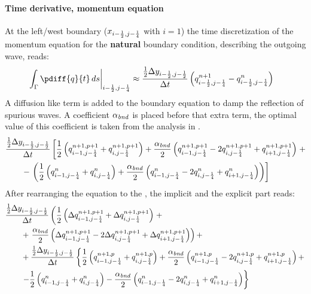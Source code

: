 \paragraph*{Time derivative, momentum equation}
At the left/west boundary ($x_{i-\frac{1}{2}, j-\frac{1}{4}}$ with $i=1$) the time discretization of the momentum equation for the \textbf{natural} boundary condition, describing the outgoing wave, reads:
\begin{align}
    \left. \int_\Gamma\pdiff{q}{t}\, ds \right|_{i-\half, j-\quart} & \approx \frac{\half\Dy_{i-\half, j-\half}}{\Dt} \left(  q^{n+1}_{i-\half, j-\quart} - q^{n}_{i-\half, j-\quart} \right)
\end{align}
A diffusion like term is added to the boundary equation to damp the reflection of spurious waves.
A coefficient $\alpha_{\it bnd}$ is placed before that extra term, the optimal value of this coefficient is taken from the analysis in \citet{transpeq-analysisdiscretizationinsidedomain_boundaries.mw}.
\begin{align}
    & \frac{\frac{1}{2}\Delta y_{i-\frac{1}{2}, j-\frac{1}{2}}}{\Delta t}\left[ \frac{1}{2} \left( q^{n+1,p+1}_{i-1, j-\frac{1}{4}} + q^{n+1,p+1}_{i, j-\frac{1}{4}} \right)
    + \frac{\alpha_{\it bnd}}{2} \left( q^{n+1,p+1}_{i-1, j-\frac{1}{4}} - 2 q^{n+1,p+1}_{i, j-\frac{1}{4}} + q^{n+1,p+1}_{i+1, j-\frac{1}{4}}  \right) \right. +
    \nonumber \\*
    & \qquad  - \left. \left(
    \frac{1}{2} \left( q^{n}_{i-1, j-\frac{1}{4}} + q^{n}_{i, j-\frac{1}{4}} \right)
    + \frac{\alpha_{\it bnd}}{2}  \left( q^{n}_{i-1, j-\frac{1}{4}} - 2 q^{n}_{i, j-\frac{1}{4}} + q^{n}_{i+1, j-\frac{1}{4}}  \right) \right)
    \right]
\end{align}
After rearranging the equation to the \deltaformulation, the implicit and the explicit part reads:
\begin{align}
    & \frac{\frac{1}{2}\Delta y_{i-\frac{1}{2}, j-\frac{1}{2}}}{\Delta t}  \left( \frac{1}{2} \left( \Delta q^{n+1, p+1}_{i-1, j-\frac{1}{4}} + \Delta q^{n+1, p+1}_{i, j-\frac{1}{4}} \right) \right. +
    \nonumber \\*
    & \qquad + \left. \frac{\alpha_{\it bnd}}{2}\left( \Delta q^{n+1,p+1}_{i-1, j-\frac{1}{4}} - 2 \Delta q^{n+1,p+1}_{i, j-\frac{1}{4}} + \Delta q^{n+1,p+1}_{i+1, j-\frac{1}{4}} \right) \right) +
    \nonumber \\
    & \qquad +  \frac{\frac{1}{2}\Delta y_{i-\frac{1}{2}, j-\frac{1}{2}}}{\Delta t} \left\{ \frac{1}{2} \left( q^{n+1, p}_{i-1, j-\frac{1}{4}} + q^{n+1, p}_{i, j-\frac{1}{4}} \right) + \frac{\alpha_{\it bnd}}{2}\left( q^{n+1,p}_{i-1, j-\frac{1}{4}} - 2 q^{n+1,p}_{i, j-\frac{1}{4}}  + q^{n+1,p}_{i+1, j-\frac{1}{4}} \right) + \right.
    \nonumber \\*
    & \qquad
    \left.  - \frac{1}{2} \left( q^{n}_{i-1, j-\frac{1}{4}} + q^{n}_{i, j-\frac{1}{4}} \right) - \frac{\alpha_{\it bnd}}{2} \left( q^{n}_{i-1, j-\frac{1}{4}} - 2 q^{n}_{i, j-\frac{1}{4}} + q^{n}_{i+1, j-\frac{1}{4}}  \right) \right\}
\end{align}
